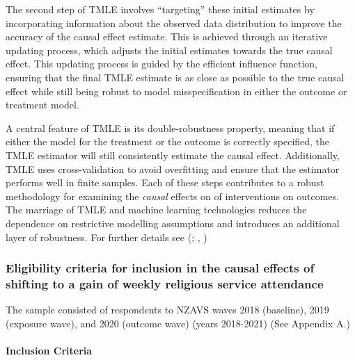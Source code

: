 \documentclass[
  singlecolumn]{article}
\let\oldparagraph\paragraph
\renewcommand{\paragraph}[1]{\oldparagraph{#1}\mbox{}}
\begin{document}
The second step of TMLE involves ``targeting'' these initial estimates
by incorporating information about the observed data distribution to
improve the accuracy of the causal effect estimate. This is achieved
through an iterative updating process, which adjusts the initial
estimates towards the true causal effect. This updating process is
guided by the efficient influence function, ensuring that the final TMLE
estimate is as close as possible to the true causal effect while still
being robust to model misspecification in either the outcome or
treatment model.

A central feature of TMLE is its double-robustness property, meaning
that if either the model for the treatment or the outcome is correctly
specified, the TMLE estimator will still consistently estimate the
causal effect. Additionally, TMLE uses cross-validation to avoid
overfitting and ensure that the estimator performs well in finite
samples. Each of these steps contributes to a robust methodology for
examining the \emph{causal} effects on of interventions on outcomes. The
marriage of TMLE and machine learning technologies reduces the
dependence on restrictive modelling assumptions and introduces an
additional layer of robustness. For further details see
(;
,
)

\subsubsection{Eligibility criteria for inclusion in the causal effects
of shifting to a gain of weekly religious service
attendance}\label{eligibility-criteria-for-inclusion-in-the-causal-effects-of-shifting-to-a-gain-of-weekly-religious-service-attendance}

The sample consisted of respondents to NZAVS waves 2018 (baseline), 2019
(exposure wave), and 2020 (outcome wave) (years 2018-2021) (See Appendix
A.)

\paragraph{Inclusion Criteria}\label{inclusion-criteria}
\end{document}

